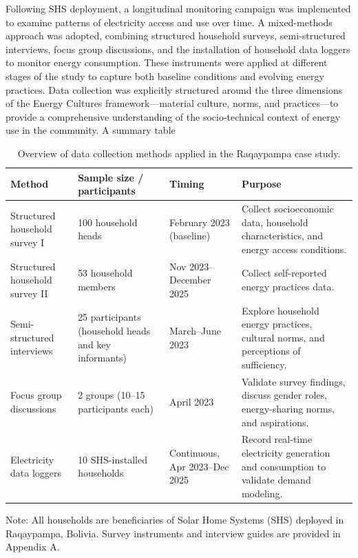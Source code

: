 \documentclass[final,3p,times,onecolumn]{elsarticle}
\begin{document}
    Following SHS deployment, a longitudinal monitoring campaign was implemented to examine patterns of electricity access and use over time. A mixed-methods approach was adopted, combining structured household surveys, semi-structured interviews, focus group discussions, and the installation of household data loggers to monitor energy consumption. These instruments were applied at different stages of the study to capture both baseline conditions and evolving energy practices. Data collection was explicitly structured around the three dimensions of the Energy Cultures framework—material culture, norms, and practices—to provide a comprehensive understanding of the socio-technical context of energy use in the community. A summary table 

    \begin{table}[ht]
\centering
\caption{Overview of data collection methods applied in the Raqaypampa case study.}
\label{tab:data_collection}
\begin{tabular}{p{3cm}p{3cm}p{3cm}p{5cm}}
\toprule
\textbf{Method} & \textbf{Sample size / participants} & \textbf{Timing} & \textbf{Purpose} \\ 
\midrule
Structured household survey I & 100 household heads & February 2023 (baseline) & Collect socioeconomic data, household characteristics, and energy access conditions. \\

Structured household survey II & 53 household members & Nov 2023--December 2025 & Collect self-reported energy practices data. \\

Semi-structured interviews & 25 participants (household heads and key informants) & March--June 2023 & Explore household energy practices, cultural norms, and perceptions of sufficiency. \\

Focus group discussions & 2 groups (10--15 participants each) & April 2023 & Validate survey findings, discuss gender roles, energy-sharing norms, and aspirations. \\

Electricity data loggers & 10 SHS-installed households & Continuous, Apr 2023--Dec 2025 & Record real-time electricity generation and consumption to validate demand modeling. \\ 
\bottomrule
\end{tabular}
\begin{tablenotes}
\small
\item Note: All households are beneficiaries of Solar Home Systems (SHS) deployed in Raqaypampa, Bolivia. Survey instruments and interview guides are provided in Appendix A.
\end{tablenotes}
\end{table}
    
\end{document}
